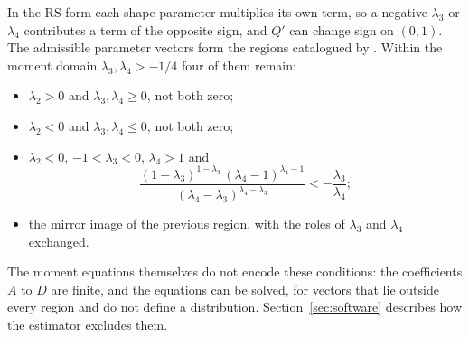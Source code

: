 In the RS form each shape parameter multiplies its own term, so a negative
$\lambda_3$ or $\lambda_4$ contributes a term of the opposite sign, and $Q'$ can
change sign on $(0,1)$. The admissible parameter vectors form the regions
catalogued by \textcite{KarianDudewicz2000}. Within the moment domain
$\lambda_3, \lambda_4 > -1/4$ four of them remain:
\begin{itemize}
    \item $\lambda_2 > 0$ and $\lambda_3, \lambda_4 \geq 0$, not both zero;
    \item $\lambda_2 < 0$ and $\lambda_3, \lambda_4 \leq 0$, not both zero;
    \item $\lambda_2 < 0$, $-1 < \lambda_3 < 0$, $\lambda_4 > 1$ and
    \begin{equation*}
        \frac{(1-\lambda_3)^{1-\lambda_3}\,(\lambda_4-1)^{\lambda_4-1}}
             {(\lambda_4-\lambda_3)^{\lambda_4-\lambda_3}}
        < -\frac{\lambda_3}{\lambda_4};
    \end{equation*}
    \item the mirror image of the previous region, with the roles of
    $\lambda_3$ and $\lambda_4$ exchanged.
\end{itemize}
The moment equations themselves do not encode these conditions: the
coefficients $A$ to $D$ are finite, and the equations can be solved, for vectors
that lie outside every region and do not define a distribution.
Section~\ref{sec:software} describes how the estimator excludes them.
